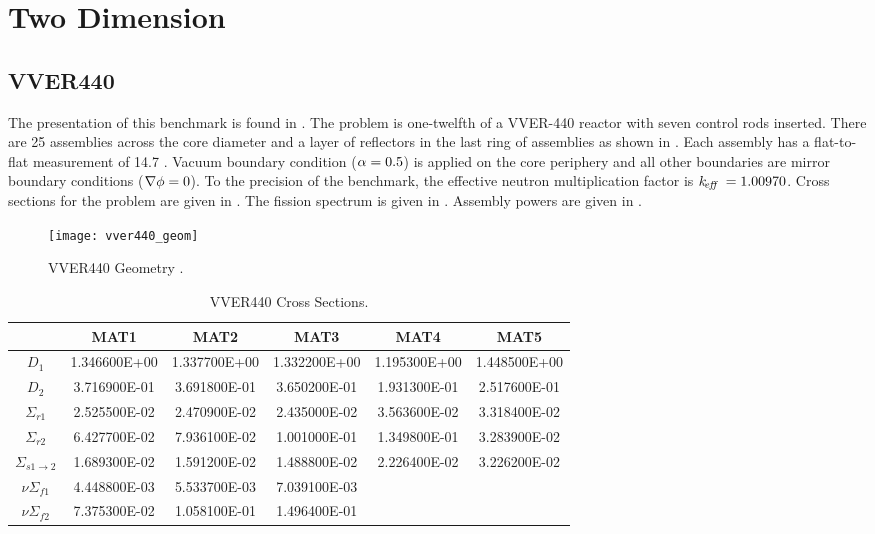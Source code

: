 \section{Two Dimension}
  \subsection{VVER440}
    \label{sec:vver440}
    The presentation of this benchmark is found in \cite{chao}. The problem is
    one-twelfth of a VVER-440 reactor with seven control rods inserted. There
    are 25 assemblies across the core diameter and a layer of reflectors in the
    last ring of assemblies as shown in . Each assembly
    has a flat-to-flat measurement of 14.7 . Vacuum boundary
    condition ($\alpha = 0.5$) is applied on the core periphery and all other
    boundaries are mirror boundary conditions ($\mathbf{\nabla} \phi = 0$). To the
    precision of the benchmark, the effective neutron multiplication factor is
    $k_{\!\mbox{\scriptsize \em eff}}\  = 1.00970$. Cross sections for the problem are given in
    . The fission spectrum is given in
    . Assembly powers are given in .
    \begin{figure}
      \centering
      \texttt{[image: vver440\_geom]}
      \caption{VVER440 Geometry \cite{chao}.}
      \label{fig:vver440_geom}
    \end{figure}
    \begin{table}
      \caption{VVER440 Cross Sections.}
      \label{tab:vver440xs}
      \begin{center}
        \begin{tabular}{cccccc}
          \toprule
          &MAT1&MAT2&MAT3&MAT4&MAT5\\
          \midrule
          $D_1$&1.346600E+00&1.337700E+00&1.332200E+00&1.195300E+00&1.448500E+00\\
          $D_2$&3.716900E-01&3.691800E-01&3.650200E-01&1.931300E-01&2.517600E-01\\
          $\Sigma_{r1}$&2.525500E-02&2.470900E-02&2.435000E-02&3.563600E-02&3.318400E-02\\
          $\Sigma_{r2}$&6.427700E-02&7.936100E-02&1.001000E-01&1.349800E-01&3.283900E-02\\
          $\Sigma_{s 1\rightarrow 2}$&1.689300E-02&1.591200E-02&1.488800E-02&2.226400E-02&3.226200E-02\\
          $ \nu \Sigma_{f1}$&4.448800E-03&5.533700E-03&7.039100E-03&&\\
          $ \nu \Sigma_{f2}$&7.375300E-02&1.058100E-01&1.496400E-01&&\\
          \bottomrule
        \end{tabular}
      \end{center}
    \end{table}

